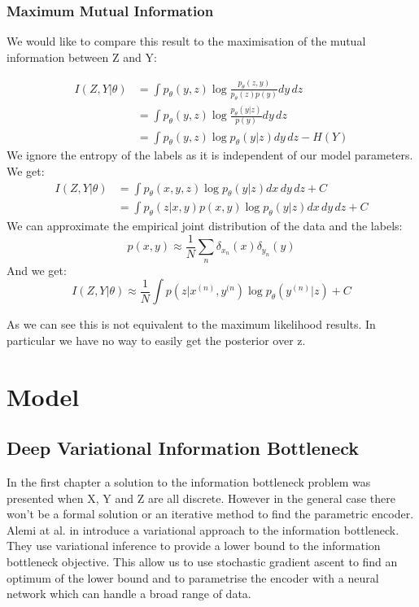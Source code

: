 \documentclass[11pt,oneside,openright]{report}
\begin{document}
\subsection{Maximum Mutual Information}

We would like to compare this result to the maximisation of the  mutual information between Z and Y:

\begin{align}
I(Z, Y|\theta) &= \int p_\theta(y, z) \log \frac{p_\theta(z, y)}{p_\theta(z)p(y)} dy\,dz\\
& = \int p_\theta(y, z) \log \frac{p_\theta(y|z)}{p(y)} dy\,dz\\
&= \int p_\theta(y, z) \log p_\theta(y|z) dy\,dz - H(Y) 
\end{align}
We ignore the entropy of the labels as it is independent of our model parameters. We get:
\begin{align}
I(Z, Y|\theta) &= \int p_\theta(x, y, z) \log p_\theta(y| z) dx\,dy\,dz + C\\
&= \int p_\theta(z | x, y) p(x, y) \log p_\theta(y | z) dx\,dy\,dz + C
\end{align}
We can approximate the empirical joint distribution of the data and the labels:
$$ p(x, y) \approx \frac{1}{N}\sum_n \delta_{x_n}(x) \delta_{y_n}(y)$$
And we get:
$$ I(Z, Y|\theta) \approx \frac{1}{N} \int p(z | x^{(n)}, y^{(n}) \log p_\theta(y^{(n)} | z) + C$$

As we can see this is not equivalent to the maximum likelihood results. In particular we have no way to easily get the posterior over z. 

\chapter{Model}
\section{Deep Variational Information Bottleneck}

In the first chapter a solution to the information bottleneck problem was presented when X, Y and Z are all discrete. However in the general case there won't be a formal solution or an iterative method to find the parametric encoder. Alemi at al. in \cite{vib} introduce a variational approach to the information bottleneck. They use variational inference to provide a lower bound to the information bottleneck objective. This allow us to use stochastic gradient ascent to find an optimum of the lower bound and to parametrise the encoder with a neural network which can handle a broad range of data.
\end{document}

